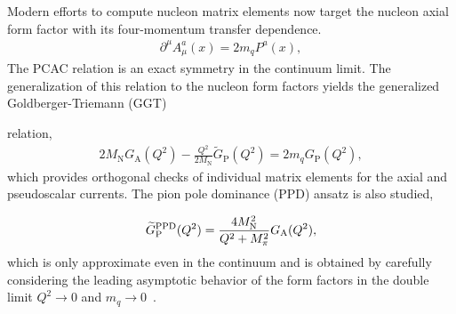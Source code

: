 Modern efforts to compute nucleon matrix elements now target the nucleon
 axial form factor with its four-momentum transfer dependence.
\begin{align}
 \partial^\mu A^{a}_{\mu}(x) = 2 m_q P^{a}(x),
 \label{eq:pcac}
\end{align}
The PCAC relation is an exact symmetry in the continuum limit.
The generalization of this relation to the nucleon form factors
 yields the generalized Goldberger-Triemann (GGT)%
 \begin{marginnote}
 \end{marginnote}%
 relation,
\begin{align}
 2 M_{\mathrm{N}} G_{\mathrm{A}}(Q^2) -\frac{Q^2}{2M_{\mathrm{N}}} \widetilde{G}_{\mathrm{P}}(Q^2) = 2 m_q G_{\mathrm{P}}(Q^2),
 \label{eq:ggt}
\end{align}
 which provides orthogonal checks of individual matrix elements
 for the axial and pseudoscalar currents.
The pion pole dominance (PPD) ansatz is also studied,%
\begin{marginnote}
 \end{marginnote}%
\begin{align}
 \widetilde{G}^{\rm PPD}_{\mathrm{P}}(Q^2) = \frac{4M_{\mathrm{N}}^2}{Q^2+M_\pi^2} G_{\mathrm{A}}(Q^2),
 \label{eq:ppd}
\end{align}
 which is only approximate even in the continuum and is obtained
 by carefully considering the leading asymptotic behavior of the
 form factors in the double limit $Q^2\to0$ and $m_q\to0$~\cite{Sasaki:2007gw}.

